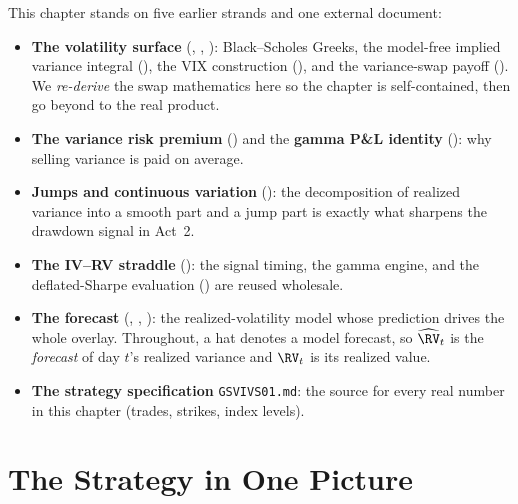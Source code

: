 \begin{prereq}[Background]
This chapter stands on five earlier strands and one external document:
\begin{itemize}
  \item \textbf{The volatility surface} (, , ): Black--Scholes Greeks, the model-free implied variance integral (), the VIX construction (), and the variance-swap payoff (). We \emph{re-derive} the swap mathematics here so the chapter is self-contained, then go beyond  to the real product.
  \item \textbf{The variance risk premium} () and the \textbf{gamma P\&L identity} (): why selling variance is paid on average.
  \item \textbf{Jumps and continuous variation} (): the decomposition of realized variance into a smooth part and a jump part is exactly what sharpens the drawdown signal in Act~2.
  \item \textbf{The IV--RV straddle} (): the signal timing, the gamma engine, and the deflated-Sharpe evaluation () are reused wholesale.
  \item \textbf{The forecast} (, , ): the realized-volatility model whose prediction drives the whole overlay. Throughout, a hat denotes a model forecast, so $\widehat{\RV}_t$ is the \emph{forecast} of day $t$'s realized variance and $\RV_t$ is its realized value.
  \item \textbf{The strategy specification} \texttt{GSVIVS01.md}: the source for every real number in this chapter (trades, strikes, index levels).
\end{itemize}
\end{prereq}

\section{The Strategy in One Picture}
\label{sec:gsvivs:picture}

